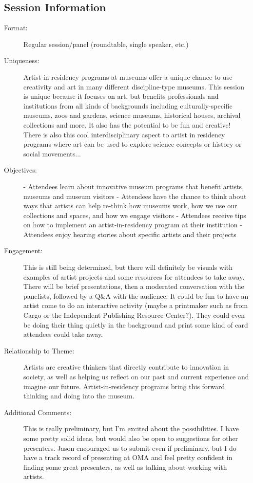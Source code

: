 \documentclass{report}
\begin{document}
              \subsection*{Session Information}
                \begin{description}
                  \item [Format:] Regular session/panel (roundtable, single speaker, etc.)
							    
							    \item [Uniqueness:]Artist-in-residency programs at museums offer a unique chance to use creativity and art in many different discipline-type museums. This session is unique because it focuses on art, but benefits professionals and institutions from all kinds of backgrounds including culturally-specific museums, zoos and gardens, science museums, historical houses, archival collections and more. It also has the potential to be fun and creative! There is also this cool interdisciplinary aspect to artist in residency programs where art can be used to explore science concepts or history or social movements...
							    \item [Objectives:]- Attendees learn about innovative museum programs that benefit artists, museums and museum visitors
- Attendees have the chance to think about ways that artists can help re-think how museums work, how we use our collections and spaces, and how we engage visitors
- Attendees receive tips on how to implement an artist-in-residency program at their institution
- Attendees enjoy hearing stories about specific artists and their projects
							    \item [Engagement:]This is still being determined, but there will definitely be visuals with examples of artist projects and some resources for attendees to take away. There will be brief presentations, then a moderated conversation with the panelists, followed by a Q\&A with the audience. It could be fun to have an artist come to do an interactive activity (maybe a printmaker such as from Cargo or the Independent Publishing Resource Center?). They could even be doing their thing quietly in the background and print some kind of card attendees could take away.
							    \item [Relationship to Theme:]Artists are creative thinkers that directly contribute to innovation in society, as well as helping us reflect on our past and current experience and imagine our future. Artist-in-residency programs bring this forward thinking and doing into the museum.
							    
                    \item [Additional Comments: ]This is really preliminary, but I'm excited about the possibilities. I have some pretty solid ideas, but would also be open to suggestions for other presenters. Jason encouraged us to submit even if preliminary, but I do have a track record of presenting at OMA and feel pretty confident in finding some great presenters, as well as talking about working with artists.

                \end{description}
\end{document}
